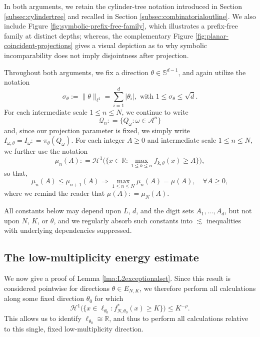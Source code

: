 \documentclass[12pt]{amsart}
\numberwithin{equation}{section}
\begin{document}
In both arguments, we retain the cylinder-tree notation introduced in Section \ref{subsec:cylindertree} and recalled in Section \ref{subsec:combinatorialoutline}. We also include Figure
\ref{fig:symbolic-prefix-free-family}, which illustrates a prefix-free family at distinct depths; whereas, the complementary Figure \ref{fig:planar-coincident-projections} gives a visual depiction as to why symbolic incomparability does not imply disjointness after projection.

Throughout both arguments, we fix a direction $\theta \in \mathbb{S}^{d-1}$, and again utilize the notation
\[
 \sigma_\theta:=\|\theta\|_{\ell^1}
 =\sum_{i=1}^d|\theta_i|, \textrm{ with } 1 \leq \sigma_{\theta} \leq \sqrt{d}.
\]
For each intermediate scale $1 \leq n \leq N$, we continue to write
$$
\mathscr{Q}_n : = \big\{Q_\omega : \omega \in \mathcal{A}^n \big\}
$$
and, since our projection parameter is fixed, we simply write $I_{\omega, \theta} = I_\omega : = \pi_{\theta} (Q_\omega)$. For each integer $A \geq 0$ and intermediate scale $1 \leq n \leq N$, we further use the notation
$$
\mu_n (A) : = \mathcal{H}^1 \big(\big\{x \in \mathbb{R} : \max_{1 \leq k \leq n} f_{k,\theta} (x) \geq A \big\} \big),
$$
so that,
$$
\mu_n (A) \leq \mu_{n+1} (A) \Rightarrow \max_{1 \leq n \leq N} \mu_n (A) = \mu (A), \quad \forall A \geq 0,
$$
where we remind the reader that $\mu (A) : = \mu_N (A)$.

All constants below may depend upon $L$, $d$, and the digit sets $A_1,...,A_d$, but not upon $N$, $K$, or $\theta$, and we regularly absorb such constants into $\lesssim$ inequalities with underlying dependencies suppressed.

\subsection{The low-multiplicity energy estimate}\label{subsec:L2exceptional}
We now give a proof of Lemma \ref{lma:L2exceptionalset}. Since this result is considered pointwise for directions $\theta \in E_{N,K}$, we therefore perform all calculations along some fixed direction $\theta_0$ for which
$$
\mathcal{H}^1 \big( \big\{x \in \ell_{\theta_0} :  f_{N,\theta_0}^* (x) \geq K  \big\}\big) \leq K^{- \rho }.
$$
This allows us to identify $\ell_{\theta_0} \cong \mathbb{R}$, and thus to perform all calculations relative to this single, fixed low-multiplicity direction.
 
\end{document}
